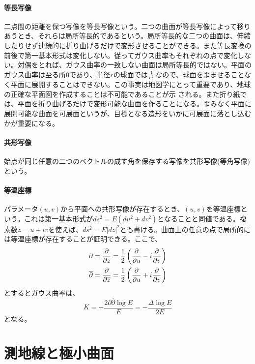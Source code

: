         \paragraph{等長写像}
            二点間の距離を保つ写像を等長写像という。二つの曲面が等長写像によって移りあうとき、それらは局所等長的であるという。局所等長的な二つの曲面は、伸縮したりせず連続的に折り曲げるだけで変形させることができる。また等長変換の前後で第一基本形式は変化しない。従ってガウス曲率もそれぞれの点で変化しない。対偶をとれば、ガウス曲率の一致しない曲面は局所等長的ではない。平面のガウス曲率は至る所0であり、半径$r$の球面では$\rec{r^2}$なので、球面を歪ませることなく平面に展開することはできない。この事実は地図学にとって重要であり、地球の正確な平面図を作成することは不可能であることが示
            される。また折り紙では、平面を折り曲げるだけで変形可能な曲面を作ることになる。歪みなく平面に展開可能な曲面を可展面というが、目標となる造形をいかに可展面に落とし込むかが重要になる。
        \paragraph{共形写像}
            始点が同じ任意の二つのベクトルの成す角を保存する写像を共形写像(等角写像)という。
        \paragraph{等温座標}
            パラメータ$(u,v)$から平面への共形写像が存在するとき、$(u,v)$を等温座標という。これは第一基本形式が$ds^2 = E(du^2+dv^2)$となることと同値である。複素数$z=u+iv$を使えば、$ds^2=E|dz|^2$とも書ける。曲面上の任意の点で局所的には等温座標が存在することが証明できる。ここで、
            \begin{align*}
                \partial = \pd[]{z} = \rec{2}\lr{\pd[]{u}-i\pd[]{v}}\\
                \overline{\partial} = \pd[]{\overline{z}}
                = \rec{2}\lr{\pd[]{u}+i\pd[]{v}}
            \end{align*}
            とするとガウス曲率は、
                \[K = -\frac{2\partial\overline{\partial}\log E}{E}
                = -\frac{\Delta \log E}{2E}\]
            となる。
            
            
    \section{測地線と極小曲面}
